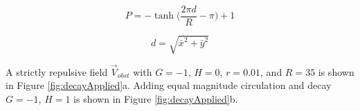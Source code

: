 \documentclass[conf]{new-aiaa}
\begin{document}
\begin{equation}
\label{eq:decay}
P = -\tanh \bigg( \frac{2\pi d}{R}-\pi\bigg)+1
\end{equation}

\begin{equation}
\label{eq:range}
d = \sqrt{ \bar{x}^2+\bar{y}^2}
\end{equation}

A strictly repulsive field $\overrightarrow{V}_{obst}$ with $G=-1$, $H=0$, $r=0.01$, and $R = 35$ is shown in Figure \ref{fig:decayApplied}a. Adding equal magnitude circulation and decay $G=-1$, $H=1$ is shown in Figure \ref{fig:decayApplied}b.


%
%
%
%
%
%
%
%
%
%

\end{document}
